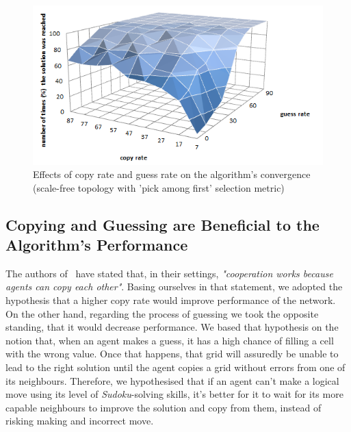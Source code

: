 \documentclass{article}
\begin{document}
\begin{figure}
\includegraphics[scale=0.60]{copy_guess_free_prob_num_solution_reached}
\caption{Effects of copy rate and guess rate on the algorithm's convergence (scale-free topology with 'pick among first' selection metric)
}
\label{fig:copy_guess_free_prob_num_solution_reached}
\end{figure}

\subsection{Copying and Guessing are Beneficial to the Algorithm's Performance}

The authors of~\cite{farenzena:collabem} have stated that, in their settings, {\em "cooperation works because agents can copy each other"}. Basing ourselves in that statement, we adopted the hypothesis that a higher copy rate would improve performance of the network. On the other hand, regarding the process of guessing we took the opposite standing, that it would decrease performance. We based that hypothesis on the notion that, when an agent makes a guess, it has a high chance of filling a cell with the wrong value. Once that happens, that grid will assuredly be unable to lead to the right solution until the agent copies a grid without errors from one of its neighbours. Therefore, we hypothesised that if an agent can't make a logical move using its level of \emph{Sudoku}-solving skills, it's better for it to wait for its more capable neighbours to improve the solution and copy from them, instead of risking making and incorrect move.
\end{document}
